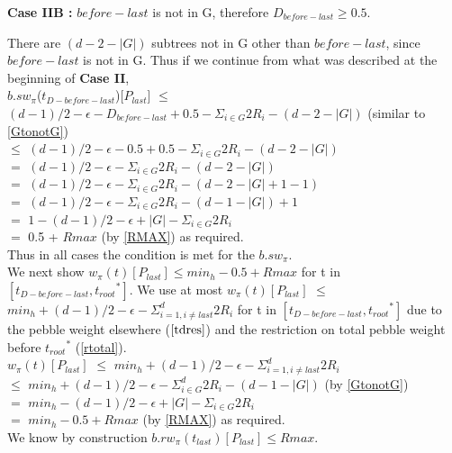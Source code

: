 \documentclass[12pt]{article}
\newcommand{\troots}{{t_{root}}^*}
\begin{document}
\noindent
{\bf Case IIB :} $before-last$ is not in G, therefore $D_{before-last} \geq 0.5$.

There are $(d-2-|G|)$ subtrees not in G other than ${before-last}$, since ${before-last}$ is not in G. Thus if we continue from what was described at the beginning of {\bf Case II},\\ 
$b.sw_{\pi}$($t_{D-before-last}$)[$P_{last}$] $\leq$ $(d-1)/2 - \epsilon - D_{before-last} + 0.5 - \Sigma_{i \in G} 2R_i - (d-2-|G|)$ (similar to \ref{GtonotG})\\
$\leq$ $(d-1)/2 - \epsilon - 0.5 + 0.5 - \Sigma_{i \in G} 2R_i - (d-2-|G|)$ \\
$=$ $(d-1)/2 - \epsilon - \Sigma_{i \in G} 2R_i - (d-2-|G|)$ \\
$=$ $(d-1)/2 - \epsilon - \Sigma_{i \in G} 2R_i - (d-2-|G|+1-1)$ \\
$=$ $(d-1)/2 - \epsilon - \Sigma_{i \in G} 2R_i - (d-1-|G|) + 1$ \\
$=$ $1 - (d-1)/2  - \epsilon + |G| - \Sigma_{i \in G} 2R_i$\\
$=$ 0.5 + $Rmax$ (by \ref{RMAX}) as required.\\ 
Thus in all cases the condition is met for the $b.sw_{\pi}$.\\



We next show $w_{\pi}(t)[P_{last}] \leq min_h-0.5+ Rmax$ for t in $[t_{D-before-last}, \troots]$. We use at most $w_{\pi}(t)[P_{last}]$ $\leq$ $min_h + (d - 1)/2 - \epsilon - \Sigma_{i=1, i \ne last}^d 2R_i$ for t in $[t_{D-before-last}, \troots]$ due to the pebble weight elsewhere ($\ref{tdres}$) and the restriction on total pebble weight before $\troots$ (\ref{rtotal}).\\
$w_{\pi}(t)[P_{last}]$ $\leq$ $min_h+(d-1)/2 - \epsilon - \Sigma_{i=1, i \ne last}^d 2R_i$\\
$\leq$ $min_h+(d-1)/2 - \epsilon - \Sigma_{i \in G}^d 2R_i - (d-1-|G|)$ (by \ref{GtonotG})\\
$=$ $min_h-(d-1)/2  - \epsilon + |G| - \Sigma_{i \in G} 2R_i$\\
$=$ $min_h-0.5+ Rmax$ (by \ref{RMAX}) as required.\\

We know by construction $b.rw_\pi(t_{last})[P_{last}] \leq Rmax$.\\
\end{document}
